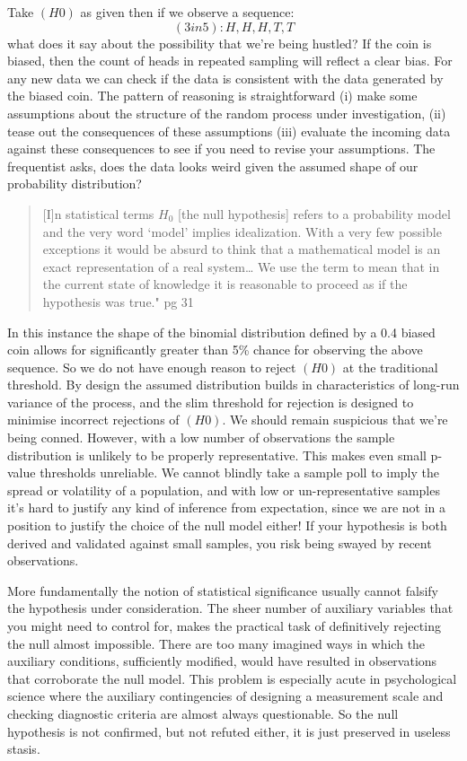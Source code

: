 \documentclass[
]{book}
\theoremstyle{definition}
\theoremstyle{definition}
\theoremstyle{definition}
\theoremstyle{remark}
\begin{document}
Take \((H0)\) as given then if we observe a sequence: \[ (3in5): H, H, H, T, T\] what does it say about the possibility that we're being hustled? If the coin is biased, then the count of heads in repeated sampling will reflect a clear bias. For any new data we can check if the data is consistent with the data generated by the biased coin. The pattern of reasoning is straightforward (i) make some assumptions about the structure of the random process under investigation, (ii) tease out the consequences of these assumptions (iii) evaluate the incoming data against these consequences to see if you need to revise your assumptions. The frequentist asks, does the data looks weird given the assumed shape of our probability distribution?

\begin{quote}
{[}I{]}n statistical terms \(H_{0}\) {[}the null hypothesis{]} refers to a probability model and the very word `model' implies idealization. With a very few possible exceptions it would be absurd to think that a mathematical model is an exact representation of a real system\ldots{} We use the term to mean that in the current state of knowledge it is reasonable to proceed as if the hypothesis was true." pg 31 \citep{cox2006pos}
\end{quote}

In this instance the shape of the binomial distribution defined by a 0.4 biased coin allows for significantly greater than 5\% chance for observing the above sequence. So we do not have enough reason to reject \((H0)\) at the traditional threshold. By design the assumed distribution builds in characteristics of long-run variance of the process, and the slim threshold for rejection is designed to minimise incorrect rejections of \((H0)\). We should remain suspicious that we're being conned. However, with a low number of observations the sample distribution is unlikely to be properly representative. This makes even small p-value thresholds unreliable. We cannot blindly take a sample poll to imply the spread or volatility of a population, and with low or un-representative samples it's hard to justify any kind of inference from expectation, since we are not in a position to justify the choice of the null model either! If your hypothesis is both derived and validated against small samples, you risk being swayed by recent observations.

More fundamentally the notion of statistical significance usually cannot falsify the hypothesis under consideration. The sheer number of auxiliary variables that you might need to control for, makes the practical task of definitively rejecting the null almost impossible. There are too many imagined ways in which the auxiliary conditions, sufficiently modified, would have resulted in observations that corroborate the null model. This problem is especially acute in psychological science where the auxiliary contingencies of designing a measurement scale and checking diagnostic criteria are almost always questionable. So the null hypothesis is not confirmed, but not refuted either, it is just preserved in useless stasis.
\end{document}
